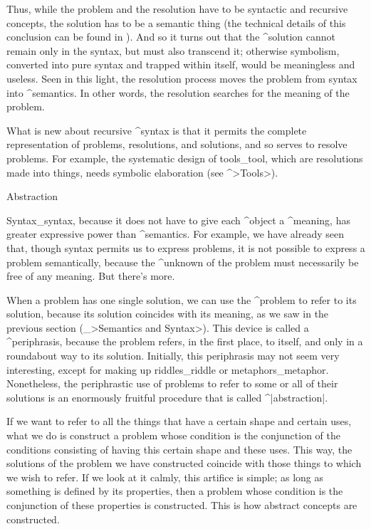 Thus, while the problem and the resolution have to be syntactic and
recursive concepts, the solution has to be a semantic thing (the
technical details of this conclusion can be found in ). And so
it turns out that the ^{solution} cannot remain only in the syntax, but
must also transcend it; otherwise symbolism, converted into pure syntax
and trapped within itself, would be meaningless and useless. Seen in
this light, the resolution process moves the problem from syntax into
^{semantics}. In other words, the resolution searches for the meaning of
the problem.

What is new about recursive ^{syntax} is that it permits the complete
representation of problems, resolutions, and solutions, and so serves to
resolve problems. For example, the systematic design of tools_{tool},
which are resolutions made into things, needs symbolic elaboration (see
^>Tools>).


\Section Abstraction

Syntax_{syntax}, because it does not have to give each ^{object} a
^{meaning}, has greater expressive power than ^{semantics}. For example,
we have already seen that, though syntax permits us to express problems,
it is not possible to express a problem semantically, because the
^{unknown} of the problem must necessarily be free of any meaning. But
there's more.

When a problem has one single solution, we can use the ^{problem} to
refer to its solution, because its solution coincides with its meaning,
as we saw in the previous section (_>Semantics and Syntax>). This device
is called a ^{periphrasis}, because the problem refers, in the first
place, to itself, and only in a roundabout way to its solution.
Initially, this periphrasis may not seem very interesting, except for
making up riddles_{riddle} or metaphors_{metaphor}. Nonetheless, the
periphrastic use of problems to refer to some or all of their solutions
is an enormously fruitful procedure that is called ^|abstraction|.

If we want to refer to all the things that have a certain shape and
certain uses, what we do is construct a problem whose condition is the
conjunction of the conditions consisting of having this certain shape
and these uses. This way, the solutions of the problem we have
constructed coincide with those things to which we wish to refer. If we
look at it calmly, this artifice is simple; as long as something is
defined by its properties, then a problem whose condition is the
conjunction of these properties is constructed. This is how abstract
concepts are constructed.

